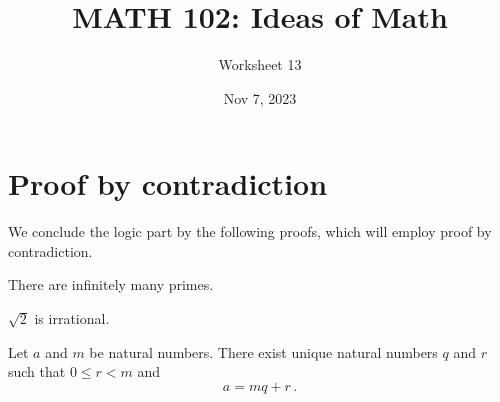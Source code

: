 \documentclass[12pt]{amsart}
\title{ MATH 102: Ideas  of Math }
\author{ Worksheet 13 }
\date{Nov 7, 2023}
\begin{document}
\maketitle
\section*{Proof by contradiction}
We conclude the logic part by the following proofs, which will
employ proof by contradiction.
\begin{theorem}
	There are infinitely many primes.
\end{theorem}

\vspace{7cm}

\begin{theorem}
	$\sqrt{2}$ is irrational.
\end{theorem}

\vspace{7cm}

\begin{theorem}
	Let $a$ and $m$ be natural numbers. There exist unique
	natural numbers $q$ and $r$ such that $0 \leq r <m$ and
	$$ a = mq + r\,.$$
\end{theorem}
\end{document}
